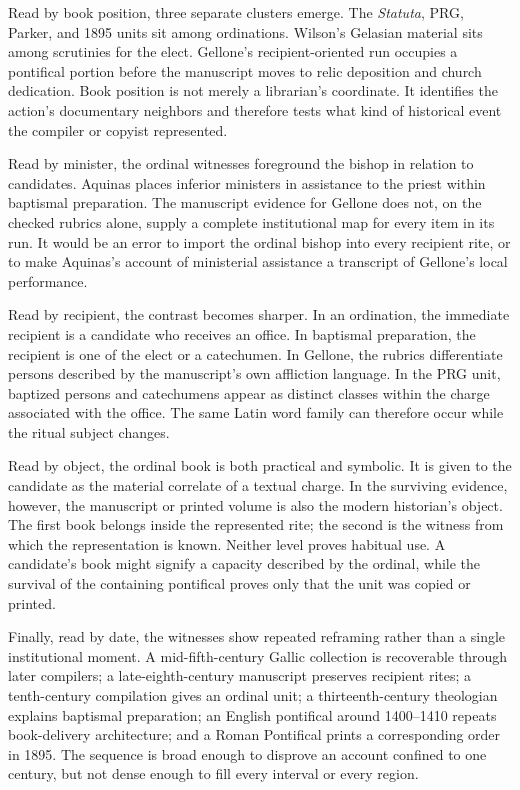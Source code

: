 Read by book position, three separate clusters emerge. The \emph{Statuta},
PRG, Parker, and 1895 units sit among ordinations. Wilson's Gelasian material
sits among scrutinies for the elect. Gellone's recipient-oriented run occupies
a pontifical portion before the manuscript moves to relic deposition and
church dedication. Book position is not merely a librarian's coordinate. It
identifies the action's documentary neighbors and therefore tests what kind
of historical event the compiler or copyist represented.

Read by minister, the ordinal witnesses foreground the bishop in relation to
candidates. Aquinas places inferior ministers in assistance to the priest
within baptismal preparation. The manuscript evidence for Gellone does not,
on the checked rubrics alone, supply a complete institutional map for every
item in its run. It would be an error to import the ordinal bishop into every
recipient rite, or to make Aquinas's account of ministerial assistance a
transcript of Gellone's local performance.

Read by recipient, the contrast becomes sharper. In an ordination, the
immediate recipient is a candidate who receives an office. In baptismal
preparation, the recipient is one of the elect or a catechumen. In Gellone,
the rubrics differentiate persons described by the manuscript's own
affliction language. In the PRG unit, baptized persons and catechumens appear
as distinct classes within the charge associated with the office. The same
Latin word family can therefore occur while the ritual subject changes.

Read by object, the ordinal book is both practical and symbolic. It is given
to the candidate as the material correlate of a textual charge. In the
surviving evidence, however, the manuscript or printed volume is also the
modern historian's object. The first book belongs inside the represented
rite; the second is the witness from which the representation is known.
Neither level proves habitual use. A candidate's book might signify a
capacity described by the ordinal, while the survival of the containing
pontifical proves only that the unit was copied or printed.

Finally, read by date, the witnesses show repeated reframing rather than a
single institutional moment. A mid-fifth-century Gallic collection is
recoverable through later compilers; a late-eighth-century manuscript
preserves recipient rites; a tenth-century compilation gives an ordinal
unit; a thirteenth-century theologian explains baptismal preparation; an
English pontifical around 1400--1410 repeats book-delivery architecture; and a
Roman Pontifical prints a corresponding order in 1895. The sequence is broad
enough to disprove an account confined to one century, but not dense enough
to fill every interval or every region.

